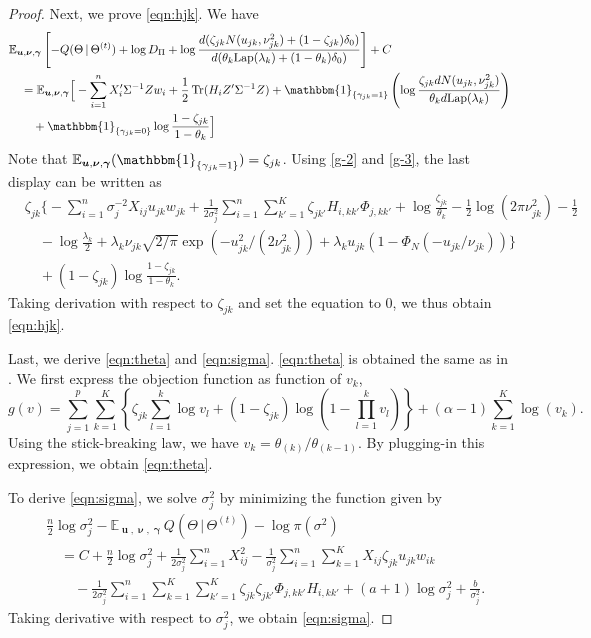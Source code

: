 \documentclass[pdftex]{imsart}
\DeclareMathOperator{\Tr}{Tr}
\DeclareMathOperator*{\bu}{\boldsymbol{u}}
\DeclareMathOperator*{\bnu}{\boldsymbol{\nu}}
\DeclareMathOperator*{\bgamma}{\boldsymbol{\gamma}}
\newcommand{\given}{\,|\,}
\theoremstyle{plain}
\begin{document}
\begin{proof}
Next, we prove \eqref{eqn:hjk}. We have
\begin{align}
& \mathbb{E}_{\bu, \bnu, \bgamma}
\left[-Q(\Theta \given \Theta^{(t)}) + \log D_\Pi
+ \log \frac{
d(\zeta_{jk} N(u_{jk}, \nu_{jk}^2) + (1 - \zeta_{jk})\delta_0)
}{
d(\theta_k \text{Lap}(\lambda_k) + (1-\theta_k) \delta_0)
}\right] + C
\nonumber \\
& \quad = 
 \mathbb{E}_{\bu, \bnu, \bgamma}
 \Big[
 - \sum_{i=1}^n X_i' \Sigma^{-1} Z w_i + \frac{1}{2}\Tr(H_iZ'\Sigma^{-1} Z) +
 \mathbbm{1}_{\{\gamma_{jk}=1\}} 
 \left(
 \log \frac{\zeta_{jk} dN(u_{jk}, \nu_{jk}^2)}{\theta_k d\text{Lap}(\lambda_k)}
 \right) \nonumber \\
& \quad \quad + \mathbbm{1}_{\{\gamma_{jk} = 0\}} \log \frac{1 - \zeta_{jk}}{1 - \theta_k}
 \Big] \nonumber 
\end{align}
Note that $ \mathbb{E}_{\bu, \bnu, \bgamma}( \mathbbm{1}_{\{\gamma_{jk}=1\}} ) = \zeta_{jk}$.
Using \eqref{g-2} and \eqref{g-3}, the last display can be written as 
\begin{align*}
& \zeta_{jk} \Big\{
- \sum_{i=1}^n \sigma_j^{-2} X_{ij} u_{jk} w_{jk} + \frac{1}{2\sigma_j^2} \sum_{i=1}^n \sum_{k'=1}^K \zeta_{jk'} H_{i,kk'} \Phi_{j,kk'} 
+ \log \frac{\zeta_{jk}}{\theta_k} - \frac{1}{2}\log (2\pi  \nu_{jk}^2) - \frac{1}{2} \\
& \quad  - \log \frac{\lambda_k}{2} + \lambda_k\nu_{jk} \sqrt{2/\pi} \exp(- u_{jk}^2/(2 \nu_{jk}^2)) + \lambda_k u_{jk} (1 - \Phi_N(- u_{jk}/\nu_{jk}))
\Big\}\\
& \quad + (1 - \zeta_{jk}) \log \frac{1-\zeta_{jk}}{1 - \theta_k}.
\end{align*}
Taking derivation with respect to $\zeta_{jk}$ and set the equation to 0, we thus obtain \eqref{eqn:hjk}.

Last, we derive \eqref{eqn:theta} and \eqref{eqn:sigma}. 
\eqref{eqn:theta} is obtained the same as in \citet{rockova16}. 
We first express the objection function as function of $v_k$,
$$
g(v) = \sum_{j=1}^p \sum_{k = 1}^K \left\{ \zeta_{jk} \sum_{l=1}^k \log v_l + (1-\zeta_{jk}) \log (1 - \prod_{l=1}^k v_l) \right\}+ (\alpha - 1) \sum_{k=1}^K \log (v_k).
$$
Using the stick-breaking law, we have $v_k = \theta_{(k)}/\theta_{(k-1)}$. By plugging-in this expression, we obtain \eqref{eqn:theta}. 

To derive \eqref{eqn:sigma}, we solve $\sigma_j^2$ by minimizing the function given by
\begin{align*}
& \frac{n}{2} \log \sigma_j^2 - \mathbb{E}_{\bu, \bnu, \bgamma} Q(\Theta \given \Theta^{(t)}) - \log \pi(\sigma^{2})\\
& \quad 
= C + \frac{n}{2} \log \sigma_j^2  + \frac{1}{2\sigma_j^2} \sum_{i=1}^n X_{ij}^2 
- \frac{1}{\sigma_j^{2}} \sum_{i=1}^n \sum_{k=1}^K X_{ij} \zeta_{jk} u_{jk} w_{ik} \\
& \quad \quad
- \frac{1}{2\sigma_j^{2}} \sum_{i=1}^n \sum_{k=1}^K \sum_{k' = 1}^K \zeta_{jk} \zeta_{jk'} \Phi_{j,kk'} H_{i, kk'}
+ (a + 1) \log \sigma_j^2 +\frac{b}{\sigma_j^2}.
\end{align*}
Taking derivative with respect to $\sigma_j^2$, we obtain \eqref{eqn:sigma}.

\end{proof}




\end{document}
